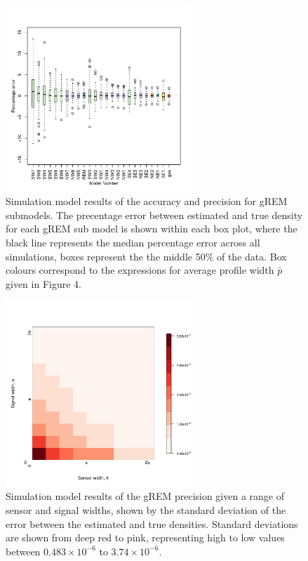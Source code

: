 \documentclass[a4paper,10pt,reqno,oneside]{amsart}
\begin{document}
\begin{figure}[t]
	\centering
	\includegraphics[width=7cm]{imgs/AverageModelBias.pdf}
       	\caption{Simulation model results of the accuracy and precision for gREM submodels. The precentage error between estimated and true density for each gREM sub model is shown within each box plot, where the black line represents the median percentage error across all simulations, boxes represent the the middle 50\% of the data. Box colours correspond to the expressions for average profile width $\bar{p}$ given in Figure 4.        
} 
	\label{f:ModelBias}
\end{figure}
	
\begin{figure}[t]
	\includegraphics[width=7cm]{imgs/ResultStandardDeviation.pdf}
	\caption{Simulation model results of the gREM precision given a range of sensor and signal widths, shown by the standard deviation of the error between the estimated and true densities. Standard deviations are shown from deep red to pink, representing high to low values between $0.483\times10^{-6}$ to $3.74\times10^{-6}$. 
        } 
	\label{f:StandardDevaition}
\end{figure}
\end{document}
